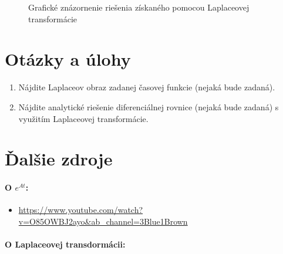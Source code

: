 \documentclass[a4paper, 10pt, ]{article}
\begin{document}
\begin{figure}[!ht]
	\centering


	\caption{Grafické znázornenie riešenia získaného pomocou Laplaceovej transformácie}
	\label{Grafické znázornenie riešenia získaného pomocou Laplaceovej transformácie}
\end{figure}








\section{Otázky a úlohy}

\begin{enumerate}[leftmargin=0pt, labelsep=3mm, itemsep=0pt]
    \item Nájdite Laplaceov obraz zadanej časovej funkcie (nejaká bude zadaná).
	\item Nájdite analytické riešenie diferenciálnej rovnice (nejaká bude zadaná) s využitím Laplaceovej transformácie.

\end{enumerate}











{}
% 




\section*{Ďalšie zdroje}

\paragraph{O $e^{At}$:}

\begin{itemize}[leftmargin=0pt, labelsep=3mm, itemsep=0pt]
	\item \url{https://www.youtube.com/watch?v=O85OWBJ2ayo&ab_channel=3Blue1Brown}
\end{itemize}


\paragraph{O Laplaceovej transdormácii:}
\end{document}
